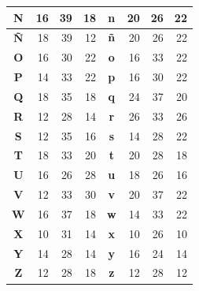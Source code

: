 \documentclass[10pt,presentation]{beamer}
\begin{document}
\begin{frame}
\begin{table}
\begin{tabular}{c|r|r|r|c|r|r|r}
	    \textbf{N}   & 16   &   39   &   18   &   \textbf{n}   & 20   &   26   &   22   \\\hline
	    \textbf{Ñ}   & 18   &   39   &   12   &   \textbf{ñ}   & 20   &   26   &   22   \\\hline
	    \textbf{O}   & 16   &   30   &   22   &   \textbf{o}   & 16   &   33   &   22   \\\hline
	    \textbf{P}   & 14   &   33   &   22   &   \textbf{p}   & 16   &   30   &   22   \\\hline
	    \textbf{Q}   & 18   &   35   &   18   &   \textbf{q}   & 24   &   37   &   20   \\\hline
	    \textbf{R}   & 12   &   28   &   14   &   \textbf{r}   & 26   &   33   &   26   \\\hline
	    \textbf{S}   & 12   &   35   &   16   &   \textbf{s}   & 14   &   28   &   22   \\\hline
	    \textbf{T}   & 18   &   33   &   20   &   \textbf{t}   & 20   &   28   &   18   \\\hline
	    \textbf{U}   & 16   &   26   &   28   &   \textbf{u}   & 18   &   26   &   16   \\\hline
	    \textbf{V}   & 12   &   33   &   30   &   \textbf{v}   & 20   &   37   &   22   \\\hline
	    \textbf{W}   & 16   &   37   &   18   &   \textbf{w}   & 14   &   33   &   22   \\\hline
	    \textbf{X}   & 10   &   31   &   14   &   \textbf{x}   & 10   &   26   &   10   \\\hline
	    \textbf{Y}   & 14   &   28   &   14   &   \textbf{y}   & 16   &   24   &   14   \\\hline
	    \textbf{Z}   & 12   &   28   &   18   &   \textbf{z}   & 12   &   28   &   12   \\\hline
	\end{tabular}
    \end{table}
\end{frame}
\end{document}
